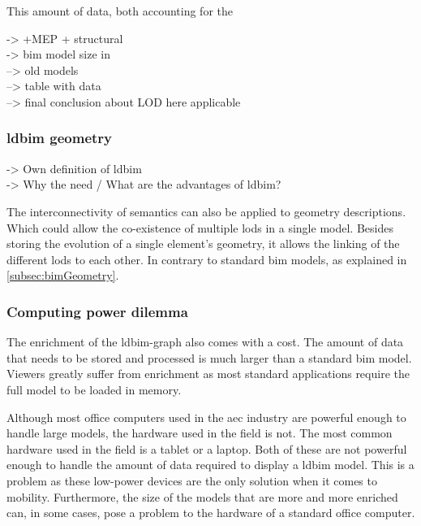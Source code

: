 This amount of data, both accounting for the

-> +MEP + structural\\
-> bim model size in \cite{Johansson2015}\\
--> old models\\
--> table with data\\
--> final conclusion about LOD here applicable

\subsubsection{\acs{ldbim} geometry}
-> Own definition of \ac{ldbim}\\
-> Why the need / What are the advantages of \ac{ldbim}?

The interconnectivity of semantics can also be applied to geometry descriptions. Which could allow the co-existence of multiple \ac{lod}s in a single model. Besides storing the evolution of a single element's geometry, it allows the linking of the different \ac{lod}s to each other. In contrary to standard \ac{bim} models, as explained in \ref{subsec:bimGeometry}.

\subsubsection{Computing power dilemma} \label{subsec:computingPower}
The enrichment of the \ac{ldbim}-graph also comes with a cost. The amount of data that needs to be stored and processed is much larger than a standard \ac{bim} model. Viewers greatly suffer from enrichment as most standard applications require the full model to be loaded in memory.

Although most office computers used in the \ac{aec} industry are powerful enough to handle large models, the hardware used in the field is not. The most common hardware used in the field is a tablet or a laptop. Both of these are not powerful enough to handle the amount of data required to display a \ac{ldbim} model. This is a problem as these low-power devices are the only solution when it comes to mobility. Furthermore, the size of the models that are more and more enriched can, in some cases, pose a problem to the hardware of a standard office computer.

